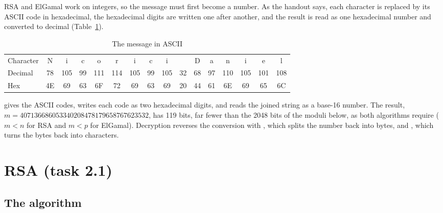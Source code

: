 \documentclass[11pt,a4paper]{article}
\begin{document}
RSA and ElGamal work on integers, so the message must first become a number. As the handout says,
each character is replaced by its ASCII code in hexadecimal, the hexadecimal digits are written
one after another, and the result is read as one hexadecimal number and converted to decimal
(Table~\ref{tab:ascii}).

\begin{table}[H]
\centering
\caption{The message in ASCII}\label{tab:ascii}
\setlength{\tabcolsep}{3.3pt}
\small
\begin{tabular}{l*{15}{c}}
\toprule
Character & N & i & c & o & r & i & c & i & \textvisiblespace & D & a & n & i & e & l \\
Decimal & 78 & 105 & 99 & 111 & 114 & 105 & 99 & 105 & 32 & 68 & 97 & 110 & 105 & 101 & 108 \\
Hex & 4E & 69 & 63 & 6F & 72 & 69 & 63 & 69 & 20 & 44 & 61 & 6E & 69 & 65 & 6C \\
\bottomrule
\end{tabular}
\end{table}




 gives the ASCII codes,  writes each code as
two hexadecimal digits, and  reads the joined string as a base-16 number.
The result, $m = 407136686053340208478179658767623532$, has 119 bits, far fewer than the 2048 bits
of the moduli below, as both algorithms require ($m < n$ for RSA and $m < p$ for ElGamal).
Decryption reverses the conversion with , which splits the number back
into bytes, and , which turns the bytes back into characters.

\section{RSA (task 2.1)}

\subsection{The algorithm}
\end{document}
